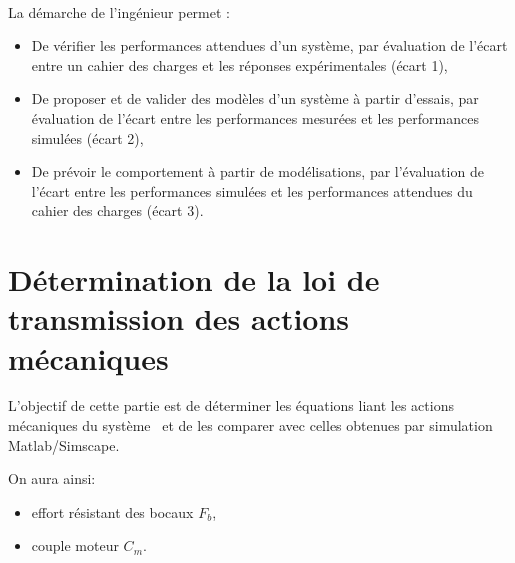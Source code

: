 

 \\

\graphicspath{{../../../img/}}
\begin{center}
\def\svgwidth{\columnwidth}

\end{center}

La démarche de l’ingénieur permet :
\begin{itemize}
 \item De vérifier les performances attendues d’un système, par évaluation de l’écart entre un cahier des charges et les réponses expérimentales (écart 1),
 \item De proposer et de valider des modèles d’un système à partir d’essais, par évaluation de l’écart entre les performances mesurées et les performances simulées (écart 2),
 \item De prévoir le comportement à partir de modélisations, par l’évaluation de l’écart entre les performances simulées et les performances attendues du cahier des charges (écart 3).
\end{itemize}


\newpage

\section{Détermination de la loi de transmission des actions mécaniques}

L'objectif de cette partie est de déterminer les équations liant les actions mécaniques du système \systemes\ et de les comparer avec celles obtenues par simulation Matlab/Simscape.

On aura ainsi:
\begin{itemize}
 \item effort résistant des bocaux $F_b$,
 \item couple moteur $C_m$.
\end{itemize}

